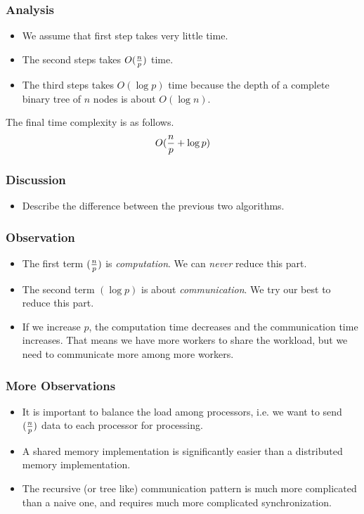 \documentclass{beamer}
\begin{document}
\begin{CJK}{UTF8}{bsmi}
\begin{frame}
\frametitle{Analysis}
\begin{itemize}
\item We assume that first step takes very little time.
\item The second steps takes $O({n \over p})$ time.
\item The third steps takes $O(\log p)$ time because the depth of a
  complete binary tree of $n$ nodes is about $O(\log n)$.
\end{itemize}
The final time complexity is as follows.
\begin{equation}
O({n \over p} + \log p)
\end{equation}
\end{frame}

\begin{frame}
\frametitle{Discussion}
\begin{itemize}
\item Describe the difference between the previous two algorithms.
\end{itemize}
\end{frame}

\begin{frame}
\frametitle{Observation}
\begin{itemize}
\item The first term $({n \over p})$ is {\em computation}.  We can
  {\em never} reduce this part.
\item The second term $(\log p)$ is about {\em communication}.  We try
  our best to reduce this part.
\item If we increase $p$, the computation time decreases and the
  communication time increases.  That means we have more workers to
  share the workload, but we need to communicate more among more
  workers.
\end{itemize}
\end{frame}

\begin{frame}
\frametitle{More Observations}
\begin{itemize}
\item It is important to balance the load among processors, i.e. we
  want to send $({n \over p})$ data to each processor for processing.
\item A shared memory implementation is significantly easier than a
  distributed memory implementation.
\item The recursive (or tree like) communication pattern is much more
  complicated than a naive one, and requires much more complicated
  synchronization.
\end{itemize}
\end{frame}


\end{CJK}
\end{document}
